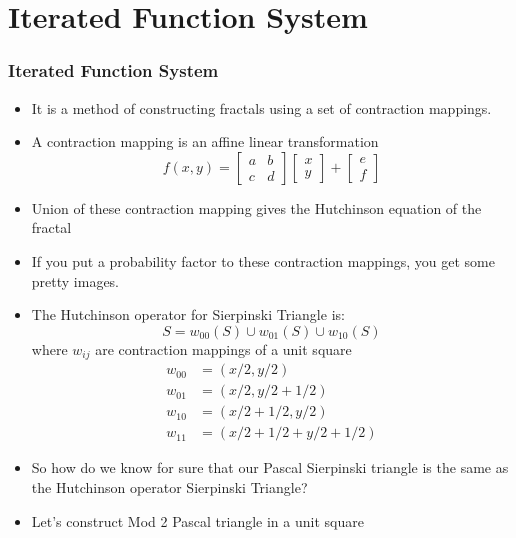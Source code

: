 \documentclass{beamer}
\begin{document}
\section{Iterated Function System}
\begin{frame}
    \frametitle{Iterated Function System}
    \begin{itemize}
        \item It is a method of constructing fractals using a set of contraction mappings. 
        \item A contraction mapping is an affine linear transformation 
        \begin{equation*}
            f(x, y)=\left[ \begin{array}{ll}{a} & {b} \\ {c} & {d}\end{array}\right] \left[ \begin{array}{l}{x} \\ {y}\end{array}\right]+\left[ \begin{array}{l}{e} \\ {f}\end{array}\right]
        \end{equation*}
        \item Union of these contraction mapping gives the Hutchinson equation of the fractal
        \item If you put a probability factor to these contraction mappings, you get some pretty images. 
    \end{itemize}
\end{frame}


\begin{frame}
    \begin{itemize}
    \item The Hutchinson operator for Sierpinski Triangle is:
    \begin{equation*}
        S = w_{00}(S) \cup w_{01}(S) \cup w_{10}(S)
    \end{equation*}
    where $w_{ij}$ are contraction mappings of a unit square
    \begin{align*}
        w_{00} &= (x/2,y/2)\\
        w_{01} &= (x/2, y/2+1/2) \\
        w_{10} &= (x/2 + 1/2, y/2) \\
        w_{11} &= (x/2 + 1/2 + y/2 + 1/2)
    \end{align*}
    \item So how do we know for sure that our Pascal Sierpinski triangle is the same as the Hutchinson operator Sierpinski Triangle?
    \item Let's construct Mod 2 Pascal triangle in a unit square 
    \end{itemize}
\end{frame}
\end{document}
